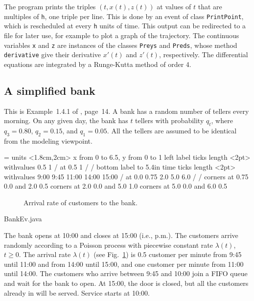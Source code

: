 The program prints the triples $(t, x(t), z(t))$ at values of
$t$ that are multiples of \texttt{h}, one triple per line.
This is done by an event of class \texttt{PrintPoint}, which is
rescheduled at every \texttt{h} units of time.
This output can be redirected to a file for later use,
for example to plot a graph of the trajectory.
The continuous variables \texttt{x} and \texttt{z} are instances of the
classes \texttt{Preys} and \texttt{Preds}, whose method \texttt{derivative}
give their derivative $x'(t)$ and $z'(t)$, respectively.
The differential equations are integrated by a Runge-Kutta method
of order 4.

\subsection {A simplified bank}
\label {sec:bank}

This is Example~1.4.1 of \cite{sBRA87a}, page~14.
A bank has a random number of tellers every morning.
On any given day, the bank has $t$ tellers with probability $q_t$,
where $q_3 = 0.80$, $q_2 = 0.15$, and $q_1 = 0.05$.
All the tellers are assumed to be identical from the modeling viewpoint.


=\vbox{\hsize=6.0in
\beginpicture
\setcoordinatesystem units <1.8cm,2cm>
\setplotarea x from 0 to 6.5, y from 0 to 1
\axis left
  label {}
  ticks length <2pt> withvalues 0.5 1 / at 0.5 1 / /
\axis bottom
  label {\hbox to 5.4in {\hfill time}}
  ticks length <2pt> withvalues 9:00 9:45 11:00 14:00 15:00 /
  at 0.0 0.75 2.0 5.0 6.0 / /
\shaderectangleson
\putrectangle corners at 0.75 0.0 and 2.0 0.5
\putrectangle corners at 2.0 0.0 and 5.0 1.0
\putrectangle corners at 5.0 0.0 and 6.0 0.5
\endpicture
}

\begin{figure}[htb]
\caption {Arrival rate of customers to the bank.}
\label {fig:blambda}
\end{figure}

%
{BankEv.java}


The bank opens at 10:00 and closes at 15:00 (i.e., { p.m.}).
The customers arrive randomly according to a Poisson process
with piecewise constant rate $\lambda(t)$, $t\ge 0$.
The arrival rate $\lambda(t)$ (see Fig.{}~\ref{fig:blambda})
is 0.5 customer per minute from
9:45 until 11:00 and from 14:00 until 15:00, and
one customer per minute from 11:00 until 14:00.
The customers who arrive between 9:45 and 10:00 join a FIFO queue
and wait for the bank to open.
At 15:00, the door is closed, but all the customers already in will be served.
Service starts at 10:00.

